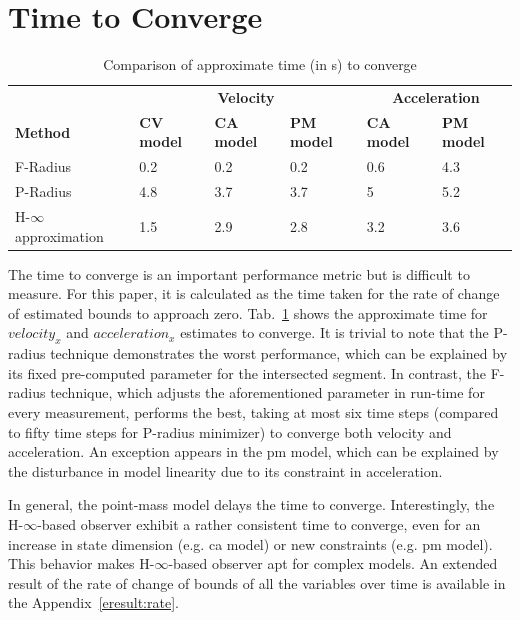 \section{Time to Converge}
\begin{table}[!h]
\caption{Comparison of approximate time (in s) to converge}
	\centering
	\renewcommand{\arraystretch}{1.1}
	\small	
	\begin{tabular}{l l l l l l}
		\toprule 
		
		& \multicolumn{3}{c}{\textbf{Velocity}} & \multicolumn{2}{c}{\textbf{Acceleration}}\\ \cmidrule(l){2-4} \cmidrule(l){5-6}
		\textbf{Method} & \textbf{CV model} & \textbf{CA model} & \textbf{PM model} & \textbf{CA model} & \textbf{PM model}\\ \midrule
		F-Radius & 0.2 & 0.2 & 0.2 & 0.6 & 4.3\\
		P-Radius & 4.8 & 3.7 & 3.7 & 5 & 5.2 \\
		H-$\infty$ approximation & 1.5 & 2.9 & 2.8 & 3.2 & 3.6\\
		\bottomrule
	\end{tabular}
	\label{tab:convtime}
\end{table}
The time to converge is an important performance metric but is difficult to measure. For this paper, it is calculated as the time taken for the rate of change of estimated bounds to approach zero. Tab.~\ref{tab:convtime} shows the approximate time for $velocity_x$ and $acceleration_x$ estimates to converge. It is trivial to note that the P-radius technique demonstrates the worst performance, which can be explained by its fixed pre-computed parameter for the intersected segment. In contrast, the F-radius technique, which adjusts the aforementioned parameter in run-time for every measurement, performs the best, taking at most six time steps (compared to fifty time steps for P-radius minimizer) to converge both velocity and acceleration. An exception appears in the pm model, which can be explained by the disturbance in model linearity due to its constraint in acceleration. 

In general, the point-mass model delays the time to converge. Interestingly, the H-$\infty$-based observer exhibit a rather consistent time to converge, even for an increase in state dimension (e.g. ca model) or new constraints (e.g. pm model). This behavior makes H-$\infty$-based observer apt for complex models. An extended result of the rate of change of bounds of all the variables over time is available in the Appendix~\ref{eresult:rate}. 

